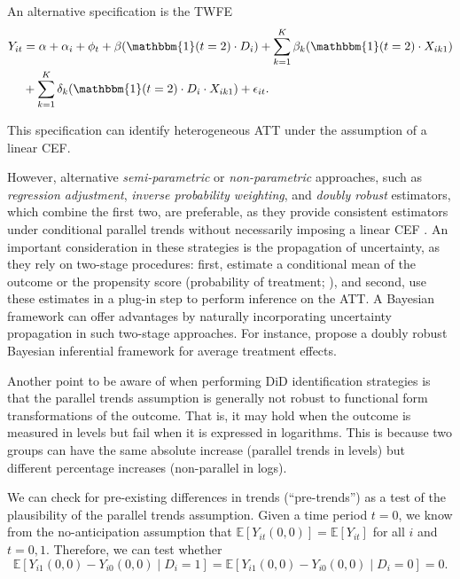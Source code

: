 An alternative specification is the TWFE
\begin{align*}
	Y_{it} & = \alpha + \alpha_i + \phi_t + \beta (\mathbbm{1}(t=2)\cdot D_i) +   \sum_{k=1}^K \beta_k (\mathbbm{1}(t=2)\cdot X_{ik1})\\
	& +  \sum_{k=1}^K \delta_k (\mathbbm{1}(t=2)\cdot D_i \cdot X_{ik1}) + \epsilon_{it}.
\end{align*}

This specification can identify heterogeneous ATT under the assumption of a linear CEF.


However, alternative \textit{semi-parametric} or \textit{non-parametric} approaches, such as \textit{regression adjustment}, \textit{inverse probability weighting}, and \textit{doubly robust} estimators, which combine the first two, are preferable, as they provide consistent estimators under conditional parallel trends without necessarily imposing a linear CEF \cite{abadie2005semiparametric,roth2023whats}. An important consideration in these strategies is the propagation of uncertainty, as they rely on two-stage procedures: first, estimate a conditional mean of the outcome or the propensity score (probability of treatment; \cite{rosenbaum1983central}), and second, use these estimates in a plug-in step to perform inference on the ATT. A Bayesian framework can offer advantages by naturally incorporating uncertainty propagation in such two-stage approaches. For instance, \cite{breunig2025double} propose a doubly robust Bayesian inferential framework for average treatment effects.

Another point to be aware of when performing DiD identification strategies is that the parallel trends assumption is generally not robust to functional form transformations of the outcome. That is, it may hold when the outcome is measured in levels but fail when it is expressed in logarithms. This is because two groups can have the same absolute increase (parallel trends in levels) but different percentage increases (non-parallel in logs).

We can check for pre-existing differences in trends (``pre-trends'') as a test of the plausibility of the parallel trends assumption. Given a time period $t = 0$, we know from the no-anticipation assumption that $\mathbb{E}[Y_{it}(0,0)] = \mathbb{E}[Y_{it}]$ for all $i$ and $t = 0,1$. Therefore, we can test whether  
\begin{equation}
	\mathbb{E}[Y_{i1}(0,0) - Y_{i0}(0,0) \mid D_i = 1] 
	= \mathbb{E}[Y_{i1}(0,0) - Y_{i0}(0,0) \mid D_i = 0] = 0.
\end{equation}

